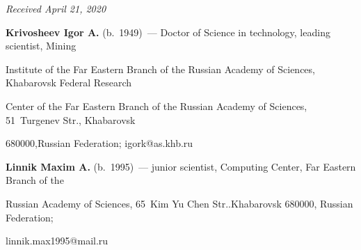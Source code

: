 {{


} }










\hfill{\small\textit{Received April 21, 2020}} 










\Contr





\noindent


\textbf{Krivosheev Igor A.} (b.\ 1949)~--- Doctor of Science in technology, leading scientist, Mining 


Institute of the Far Eastern Branch of the Russian Academy of Sciences, Khabarovsk Federal Research 


Center of the Far Eastern Branch of the Russian Academy of Sciences, 51~Turgenev Str., Khabarovsk 


680000,Russian Federation; \mbox{igork@as.khb.ru}





\vspace*{3pt}





\noindent


\textbf{Linnik Maxim A.} (b.\ 1995)~--- junior scientist, Computing Center, Far Eastern Branch of the 


Russian Academy of Sciences, 65~Kim Yu Chen Str..Khabarovsk 680000, Russian Federation; 


\mbox{linnik.max1995@mail.ru}





\label{end\stat}





\renewcommand{\bibname}{\protect\rm Литература} 


